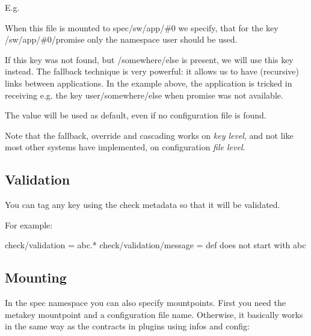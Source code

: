 E.\+g.





\begin{DoxyEnumerate}
\item When this file is mounted to {\ttfamily spec/sw/app/\#0} we specify, that for the key {\ttfamily /sw/app/\#0/promise} only the namespace {\ttfamily user} should be used.
\item If this key was not found, but {\ttfamily /somewhere/else} is present, we will use this key instead. The {\ttfamily fallback} technique is very powerful\+: it allows us to have (recursive) links between applications. In the example above, the application is tricked in receiving e.\+g. the key {\ttfamily user/somewhere/else} when {\ttfamily promise} was not available.
\item The value {} will be used as default, even if no configuration file is found.
\end{DoxyEnumerate}

Note that the fallback, override and cascading works on {\itshape key level}, and not like most other systems have implemented, on configuration {\itshape file level}.

\subsection*{Validation}

You can tag any key using the {\ttfamily check} metadata so that it will be validated.

For example\+:


\begin{DoxyCode}
check/validation = abc.*
check/validation/message = def does not start with abc
\end{DoxyCode}


\subsection*{Mounting}

In the spec namespace you can also specify mountpoints. First you need the metakey {\ttfamily mountpoint} and a configuration file name. Otherwise, it basically works in the same way as the contracts in plugins using {\ttfamily infos} and {\ttfamily config}\+:


